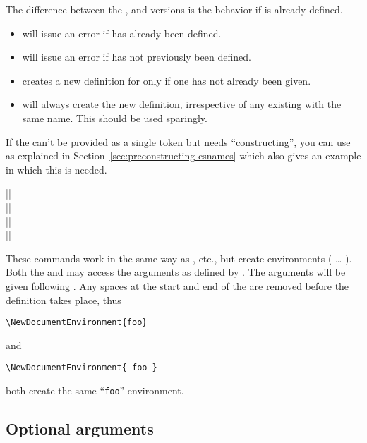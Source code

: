 \documentclass{ltxguide}
\begin{document}
The difference between the  , 
and  versions is the behavior if  is already
defined.
\begin{itemize}
 \item {} will issue an error if 
   has already been defined.
 \item {} will issue an error if 
   has not previously been defined.
 \item {} creates a new definition for
    only if one has not already been given.
 \item {} will always create the new
   definition, irrespective of any existing  with the
   same name.  This should be used sparingly.
\end{itemize}

If the  can't be provided as a single token but needs
\enquote{constructing}, you can use  as explained in
Section~\ref{sec:preconstructing-csnames} which also gives an example
in which this is needed.

\begin{decl}
  |\NewDocumentEnvironment|         \\
  |\RenewDocumentEnvironment|       \\
  |\ProvideDocumentEnvironment|     \\
  |\DeclareDocumentEnvironment|    
\end{decl}
These commands work in the same way as , etc.\@, but
create environments ( \ldots{}
). Both the  and 
may access the arguments as defined by . The arguments will be
given following . Any spaces at the start and end of the
 are removed before the definition takes place, thus
\begin{verbatim}
\NewDocumentEnvironment{foo}
\end{verbatim}
and
\begin{verbatim}
\NewDocumentEnvironment{ foo }
\end{verbatim}
both create the same \enquote{\texttt{foo}} environment.

\subsection{Optional arguments}
\label{sec:cmd:opt}
\end{document}
